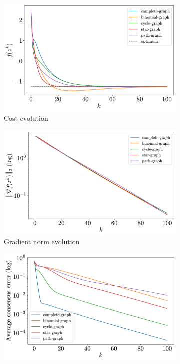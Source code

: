 \documentclass[a4paper,11pt,oneside]{book}
\begin{document}
\begin{figure}[ht]
      \centering
      \begin{subfigure}[t]{0.49\textwidth}
            \centering
            \includegraphics[width=\linewidth]{./figs/quadratic/cost_5_3_100.pdf} 
            \caption{Cost evolution}
      \end{subfigure}
      \hfill
      \begin{subfigure}[t]{0.49\textwidth}
            \centering
            \includegraphics[width=\linewidth]{./figs/quadratic/gradient_5_3_100.pdf} 
            \caption{Gradient norm evolution}
      \end{subfigure}
      \hfill
      \begin{subfigure}[t]{0.49\textwidth}
            \centering
            \includegraphics[width=\linewidth]{./figs/quadratic/consensus_5_3_100.pdf} 

\end{subfigure}
\end{figure}
\end{document}
